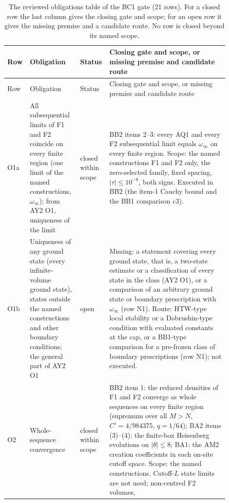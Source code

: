 {\footnotesize\setlength{\LTcapwidth}{\linewidth}
\begin{longtable}{@{}>{\raggedright\arraybackslash}p{0.06\linewidth}
 >{\raggedright\arraybackslash}p{0.22\linewidth}
 >{\raggedright\arraybackslash}p{0.10\linewidth}
 >{\raggedright\arraybackslash}p{0.52\linewidth}@{}}
\caption{The reviewed obligations table of the BC1 gate (21 rows). For a
closed row the last column gives the closing gate and scope; for an open row
it gives the missing premise and a candidate route. No row is closed beyond
its named scope.}\label{tab:bc1-obligations}\\
\toprule
Row & Obligation & Status & Closing gate and scope, or missing premise and candidate route\\
\midrule
\endfirsthead
\toprule
Row & Obligation & Status & Closing gate and scope, or missing premise and candidate route\\
\midrule
\endhead
\bottomrule
\endlastfoot
O1a & All subsequential limits of F1 and F2 coincide on every finite region
(one limit of the named constructions, $\omega_\infty$); from AY2 O1,
uniqueness of the limit & closed within scope & BB2 items 2--3: every AQ1
and every F2 subsequential limit equals $\omega_\infty$ on every finite
region. Scope: the named constructions F1 and F2 only, the zero-selected
family, fixed spacing, $|\tau|\le10^{-8}$, both signs. Executed in BB2 (the
item-1 Cauchy bound and the BB1 comparison c3).\\
O1b & Uniqueness of any ground state (every infinite-volume ground state),
states outside the named constructions and other boundary conditions; the
general part of AY2 O1 & open & Missing: a statement covering every ground
state, that is, a two-state estimate or a classification of every state in
the class (AY2 O1), or a comparison of an arbitrary ground state or boundary
prescription with $\omega_\infty$ (row N1). Route: HTW-type local stability
or a Dobrushin-type condition with evaluated constants at the cap, or a
BB1-type comparison for a pre-frozen class of boundary prescriptions (row
N1); not executed.\\
O2 & Whole-sequence convergence & closed within scope & BB2 item 1: the
reduced densities of F1 and F2 converge as whole sequences on every finite
region (supremum over all $M>N$, $C'=4/984375$, $q=1/64$); BA2 items
(3)--(4): the finite-box Heisenberg evolutions on $|\theta|\le8$; BA1: the AM2
creation coefficients in each on-site cutoff space. Scope: the named
constructions. Cutoff-$L$ state limits are not used; non-centred F2 volumes,

\end{longtable}}
